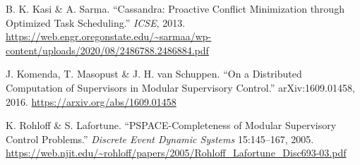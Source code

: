  B. K. Kasi \& A. Sarma. ``Cassandra: Proactive Conflict
Minimization through Optimized Task Scheduling.'' \emph{ICSE}, 2013.
\url{https://web.engr.oregonstate.edu/~sarmaa/wp-content/uploads/2020/08/2486788.2486884.pdf}

 J. Komenda, T. Masopust \& J. H. van Schuppen. ``On a
Distributed Computation of Supervisors in Modular Supervisory Control.''
arXiv:1609.01458, 2016. \url{https://arxiv.org/abs/1609.01458}

 K. Rohloff \& S. Lafortune. ``PSPACE-Completeness of Modular
Supervisory Control Problems.'' \emph{Discrete Event Dynamic Systems} 15:145--167,
2005. \url{https://web.njit.edu/~rohloff/papers/2005/Rohloff_Lafortune_Disc693-03.pdf}
